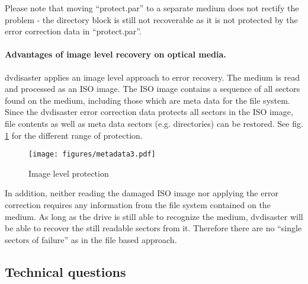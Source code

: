 {Please note that moving ``protect.par'' to a separate medium does not rectify
the problem - the directory block is still not recoverable as it is not
protected by the error correction data in ``protect.par''.

\paragraph{Advantages of image level recovery on optical media.} dvdisaster applies
an image level approach to error recovery. The medium is read and processed as an ISO
image. The ISO image contains a sequence of all sectors found on the medium, including
those which are meta data for the file system. Since the dvdisaster error correction
data protects all sectors in the ISO image, file contents as well as meta data
sectors (e.g. directories) can be restored. See fig. \ref{qa-metadata3} for the
different range of protection. 

\begin{figure}[h]
\centerline{\texttt{[image: figures/metadata3.pdf]}}
\caption{Image level protection}  
\label{qa-metadata3}
\end{figure}

In addition, neither reading the damaged ISO image nor applying the error
correction requires any information from the file system contained on the
medium. As long as the drive is still able to recognize the medium, dvdisaster
will be able to recover the still readable sectors from it. Therefore there are
no ``single sectors of failure'' as in the file based approach. }

\newpage
\subsection{Technical questions}
\label{qa-technical}
\setcounter{qaitem}{0}

